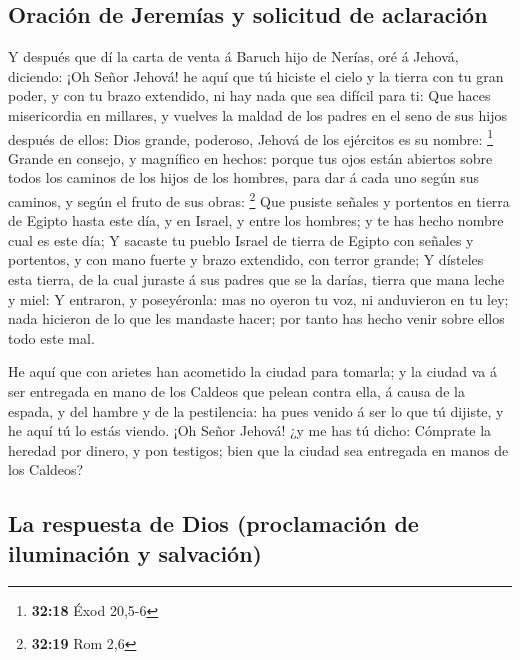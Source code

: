 \hypertarget{oraciuxf3n-de-jeremuxedas-y-solicitud-de-aclaraciuxf3n}{%
\subsection{Oración de Jeremías y solicitud de
aclaración}\label{oraciuxf3n-de-jeremuxedas-y-solicitud-de-aclaraciuxf3n}}

 Y después que dí la carta de venta á Baruch hijo de
Nerías, oré á Jehová, diciendo:  ¡Oh Señor Jehová! he
aquí que tú hiciste el cielo y la tierra con tu gran poder, y con tu
brazo extendido, ni hay nada que sea difícil para ti: 
Que haces misericordia en millares, y vuelves la maldad de los padres en
el seno de sus hijos después de ellos: Dios grande, poderoso, Jehová de
los ejércitos es su nombre: \footnote{\textbf{32:18} Éxod 20,5-6}
 Grande en consejo, y magnífico en hechos: porque tus
ojos están abiertos sobre todos los caminos de los hijos de los hombres,
para dar á cada uno según sus caminos, y según el fruto de sus obras:
\footnote{\textbf{32:19} Rom 2,6}  Que pusiste señales y
portentos en tierra de Egipto hasta este día, y en Israel, y entre los
hombres; y te has hecho nombre cual es este día;  Y
sacaste tu pueblo Israel de tierra de Egipto con señales y portentos, y
con mano fuerte y brazo extendido, con terror grande;  Y
dísteles esta tierra, de la cual juraste á sus padres que se la darías,
tierra que mana leche y miel:  Y entraron, y poseyéronla:
mas no oyeron tu voz, ni anduvieron en tu ley; nada hicieron de lo que
les mandaste hacer; por tanto has hecho venir sobre ellos todo este mal.

 He aquí que con arietes han acometido la ciudad para
tomarla; y la ciudad va á ser entregada en mano de los Caldeos que
pelean contra ella, á causa de la espada, y del hambre y de la
pestilencia: ha pues venido á ser lo que tú dijiste, y he aquí tú lo
estás viendo.  ¡Oh Señor Jehová! ¿y me has tú dicho:
Cómprate la heredad por dinero, y pon testigos; bien que la ciudad sea
entregada en manos de los Caldeos?

\hypertarget{la-respuesta-de-dios-proclamaciuxf3n-de-iluminaciuxf3n-y-salvaciuxf3n}{%
\subsection{La respuesta de Dios (proclamación de iluminación y
salvación)}\label{la-respuesta-de-dios-proclamaciuxf3n-de-iluminaciuxf3n-y-salvaciuxf3n}}

